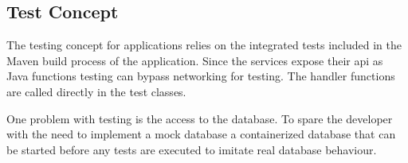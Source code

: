 \subsection{Test Concept}

The testing concept for \ms{} applications relies on the integrated tests
included in the Maven build process of the application. Since the services
expose their \gls{api} as Java functions testing can bypass networking for
testing. The handler functions are called directly in the test classes.

One problem with \ms{} testing is the access to the database. To spare the
developer with the need to implement a mock database a containerized
database that can be started before any tests are executed to imitate real
database behaviour.
